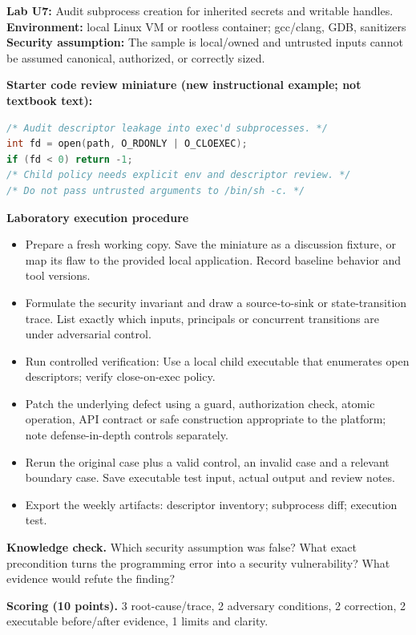 \documentclass[10pt,letterpaper]{article}
\begin{document}
\begin{insight}\textbf{Lab U7:} Audit subprocess creation for inherited secrets and writable handles.\\\textbf{Environment:} local Linux VM or rootless container; gcc/clang, GDB, sanitizers\\\textbf{Security assumption:} The sample is local/owned and untrusted inputs cannot be assumed canonical, authorized, or correctly sized.\end{insight}
\textbf{Starter code review miniature (new instructional example; not textbook text):}
\begin{lstlisting}[language=C]
/* Audit descriptor leakage into exec'd subprocesses. */
int fd = open(path, O_RDONLY | O_CLOEXEC);
if (fd < 0) return -1;
/* Child policy needs explicit env and descriptor review. */
/* Do not pass untrusted arguments to /bin/sh -c. */
\end{lstlisting}
\textbf{Laboratory execution procedure}
\begin{itemize}[leftmargin=*,itemsep=2pt]
\item Prepare a fresh working copy. Save the miniature as a discussion fixture, or map its flaw to the provided local application. Record baseline behavior and tool versions.
\item Formulate the security invariant and draw a source-to-sink or state-transition trace. List exactly which inputs, principals or concurrent transitions are under adversarial control.
\item Run controlled verification: Use a local child executable that enumerates open descriptors; verify close-on-exec policy.
\item Patch the underlying defect using a guard, authorization check, atomic operation, API contract or safe construction appropriate to the platform; note defense-in-depth controls separately.
\item Rerun the original case plus a valid control, an invalid case and a relevant boundary case. Save executable test input, actual output and review notes.
\item Export the weekly artifacts: descriptor inventory; subprocess diff; execution test.
\end{itemize}
\textbf{Knowledge check.} Which security assumption was false? What exact precondition turns the programming error into a security vulnerability? What evidence would refute the finding?

\textbf{Scoring (10 points).} 3 root-cause/trace, 2 adversary conditions, 2 correction, 2 executable before/after evidence, 1 limits and clarity.
\end{document}
